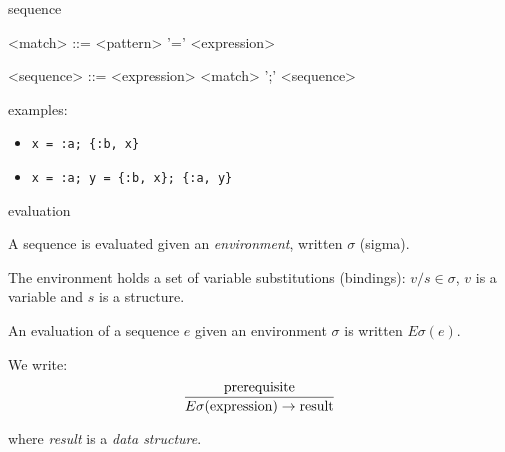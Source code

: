 \begin{frame}{sequence}

\begin{grammar}
  <match> ::=  <pattern> '=' <expression>
\end{grammar}

\pause
\begin{grammar}
  <sequence> ::=  <expression> \alt <match> ';' <sequence>
\end{grammar}

\pause\vspace{20pt}

examples:
 \begin{itemize}
   \pause \item {\tt x = :a; \{:b, x\}}
   \pause \item {\tt x = :a; y = \{:b, x\}; \{:a, y\}}
 \end{itemize}

\end{frame}

\begin{frame}{evaluation}

A sequence is evaluated given an {\em environment}, written $\sigma$ (sigma).

\pause\vspace{20pt}
The environment holds a set of variable substitutions (bindings):
$v/s \in \sigma$, $v$ is a variable and $s$ is a structure.

\pause\vspace{20pt} 
An evaluation of a sequence $e$ given an environment
$\sigma$ is written $E\sigma(e)$. 

\pause\vspace{20pt}
We write:
\vspace{20pt}
$$\frac{{\rm prerequisite}}{E\sigma({\rm expression}) \rightarrow {\rm result}}$$

\vspace{20pt}
where {\em result} is a {\em data structure}.

\end{frame}

